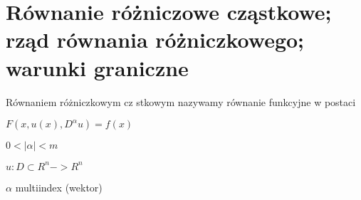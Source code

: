 \section{Równanie różniczowe cząstkowe; rząd równania różniczkowego; warunki graniczne}
Równaniem różniczkowym cz
stkowym nazywamy równanie funkcyjne w postaci

$F(x ,u(x) , D^\alpha u) = f(x)$

$0<|\alpha| < m$

$u:D \subset R^n -> R^n$

$\alpha$ multiindex (wektor)